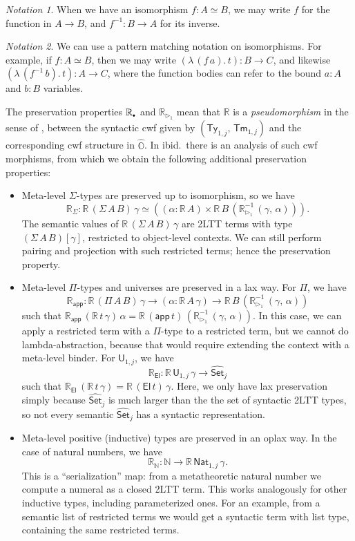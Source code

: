 \documentclass[acmsmall,screen]{acmart}
\newcommand{\msf}[1]{\mathsf{#1}}
\newcommand{\mbb}[1]{\mathbb{#1}}
\newcommand{\wh}[1]{\widehat{#1}}
\newcommand{\ext}{\triangleright}
\newcommand{\El}{\msf{El}}
\newcommand{\app}{\msf{app}}
\newcommand{\mbbo}{\mbb{O}}
\newcommand{\U}{\msf{U}}
\newcommand{\Ty}{\msf{Ty}}
\newcommand{\Tm}{\msf{Tm}}
\newcommand{\Nat}{\msf{Nat}}
\newcommand{\emptycon}{\scaleobj{.75}\bullet}
\newcommand{\Set}{\mathsf{Set}}
\newcommand{\hato}{\bm\hat{\mbbo}}
\newcommand{\re}{\mbb{R}}
\theoremstyle{remark}
\newtheorem{notation}{Notation}
\newcommand{\whset}{\wh{\Set}}
\newcommand{\rexti}{\re_{\ext_1}^{-1}}
\begin{document}
\begin{notation} When we have an isomorphism $f : A \simeq B$, we may write $f$ for the
  function in $A \to B$, and $f^{-1} : B \to A$ for its inverse.
\end{notation}

\begin{notation}
  We can use a pattern matching notation on isomorphisms. For example, if $f : A
  \simeq B$, then we may write $(\lambda\,(f\,a).\,t) : B \to C$, and likewise
  $(\lambda\,(f^{-1}\,b).\,t) : A \to C$, where the function bodies can refer to
  the bound $a : A$ and $b : B$ variables.
\end{notation}

The preservation properties $\re_{\emptycon}$ and $\re_{\ext_1}$ mean that $\re$
is a \emph{pseudomorphism} in the sense of \cite{gluing}, between the syntactic
cwf given by $(\Ty_{1,j},\,\Tm_{1,j})$ and the corresponding cwf structure in
$\hato$. In ibid.\ there is an analysis of such cwf morphisms, from which we
obtain the following additional preservation properties:
\begin{itemize}
\item Meta-level $\Sigma$-types are preserved up to isomorphism, so we have
  \[ \re_{\Sigma} : \re\,(\Sigma\,A\,B)\,\gamma
  \simeq ((\alpha : \re\,A) \times \re\,B\,(\rexti\,(\gamma,\,\alpha))). \]
  The semantic values of $\re\,(\Sigma\,A\,B)\,\gamma$
  are 2LTT terms with type $(\Sigma\,A\,B)[\gamma]$, restricted to object-level contexts.
  We can still perform pairing and projection with such restricted terms; hence
  the preservation property.
\item Meta-level $\Pi$-types and universes are preserved in a lax way. For $\Pi$, we have
  \[ \re_{\app} : \re\,(\Pi\,A\,B)\,\gamma \to (\alpha : \re\,A\,\gamma) \to \re\,B\,(\rexti\,(\gamma,\,\alpha))
  \]
  such that $\re_{\app}\,(\re\,t\,\gamma)\,\alpha =
  \re\,(\app\,t)\,(\rexti\,(\gamma,\,\alpha))$. In this case, we can apply a
  restricted term with a $\Pi$-type to a restricted term, but we cannot do
  lambda-abstraction, because that would require extending the context with a
  meta-level binder. For $\U_{1,j}$, we have
  \[
    \re_{\El} : \re\,\U_{1,j}\,\gamma \to \whset_j
  \]
  such that $\re_{\El}\,(\re\,t\,\gamma) = \re\,(\El\,t)\,\gamma$. Here, we only
  have lax preservation simply because $\whset_j$ is much larger than the the
  set of syntactic 2LTT types, so not every semantic $\whset_j$ has a syntactic
  representation.

\item Meta-level positive (inductive) types are preserved in an oplax way. In the case of
  natural numbers, we have
  \[ \re_{\mbb{N}} : \mbb{N} \to \re\,\Nat_{1,j}\,\gamma. \]
  This is a ``serialization'' map: from a metatheoretic natural number we
  compute a numeral as a closed 2LTT term. This works analogously for other
  inductive types, including parameterized ones. For an example, from a semantic
  list of restricted terms we would get a syntactic term with list type,
  containing the same restricted terms.
\end{itemize}
\end{document}
